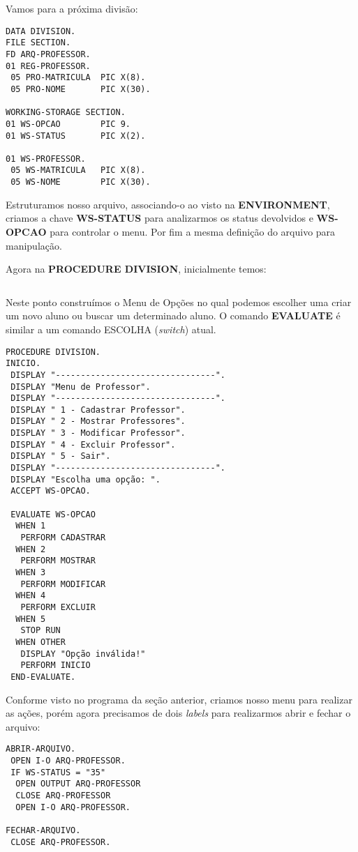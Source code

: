 Vamos para a próxima divisão:
\begin{lstlisting}[]
DATA DIVISION.
FILE SECTION.
FD ARQ-PROFESSOR.
01 REG-PROFESSOR.
 05 PRO-MATRICULA  PIC X(8).
 05 PRO-NOME       PIC X(30).

WORKING-STORAGE SECTION.
01 WS-OPCAO        PIC 9.
01 WS-STATUS       PIC X(2).

01 WS-PROFESSOR.
 05 WS-MATRICULA   PIC X(8).
 05 WS-NOME        PIC X(30).
\end{lstlisting}

Estruturamos nosso arquivo, associando-o ao visto na \textbf{ENVIRONMENT}, criamos a chave \textbf{WS-STATUS} para analizarmos os status devolvidos e \textbf{WS-OPCAO} para controlar o menu. Por fim a mesma definição do arquivo para manipulação.

Agora na \textbf{PROCEDURE DIVISION}, inicialmente temos:
\begin{lstlisting}[]
\end{lstlisting}

Neste ponto construímos o Menu de Opções no qual podemos escolher uma criar um novo aluno ou buscar um determinado aluno. O comando \textbf{EVALUATE} é similar a um comando ESCOLHA (\textit{switch}) atual.

\begin{lstlisting}[]
PROCEDURE DIVISION.
INICIO.
 DISPLAY "--------------------------------".
 DISPLAY "Menu de Professor".
 DISPLAY "--------------------------------".
 DISPLAY " 1 - Cadastrar Professor".
 DISPLAY " 2 - Mostrar Professores".
 DISPLAY " 3 - Modificar Professor".
 DISPLAY " 4 - Excluir Professor".
 DISPLAY " 5 - Sair".
 DISPLAY "--------------------------------".
 DISPLAY "Escolha uma opção: ".
 ACCEPT WS-OPCAO.

 EVALUATE WS-OPCAO
  WHEN 1 
   PERFORM CADASTRAR
  WHEN 2 
   PERFORM MOSTRAR
  WHEN 3 
   PERFORM MODIFICAR
  WHEN 4 
   PERFORM EXCLUIR
  WHEN 5
   STOP RUN
  WHEN OTHER
   DISPLAY "Opção inválida!"
   PERFORM INICIO
 END-EVALUATE. 
\end{lstlisting}

Conforme visto no programa da seção anterior, criamos nosso menu para realizar as ações, porém agora precisamos de dois \textit{labels} para realizarmos abrir e fechar o arquivo:
\begin{lstlisting}[]
ABRIR-ARQUIVO.
 OPEN I-O ARQ-PROFESSOR.
 IF WS-STATUS = "35"
  OPEN OUTPUT ARQ-PROFESSOR
  CLOSE ARQ-PROFESSOR
  OPEN I-O ARQ-PROFESSOR.

FECHAR-ARQUIVO.
 CLOSE ARQ-PROFESSOR.	
\end{lstlisting}

